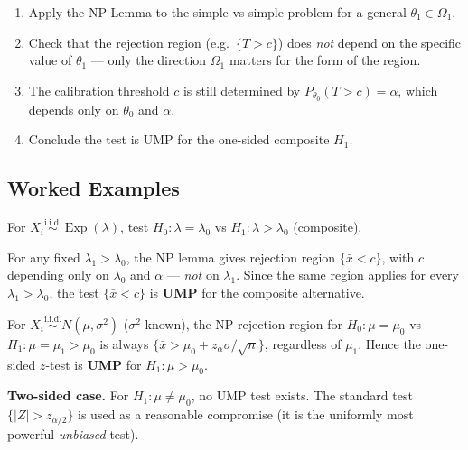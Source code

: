 \documentclass[11pt, a4paper]{article}
\newcommand{\iid}{\overset{\text{i.i.d.}}{\sim}}
\begin{document}
\begin{methodbox}
\begin{enumerate}
  \item Apply the NP Lemma to the simple-vs-simple problem for a general $\theta_1 \in \Omega_1$.
  \item Check that the rejection region (e.g.\ $\{T > c\}$) does \emph{not} depend on the specific value of $\theta_1$ --- only the direction $\Omega_1$ matters for the form of the region.
  \item The calibration threshold $c$ is still determined by $P_{\theta_0}(T > c) = \alpha$, which depends only on $\theta_0$ and $\alpha$.
  \item Conclude the test is UMP for the one-sided composite $H_1$.
\end{enumerate}
\end{methodbox}

\subsection*{Worked Examples}

\begin{exbox}
For $X_i \iid \operatorname{Exp}(\lambda)$, test $H_0\colon \lambda = \lambda_0$ vs $H_1\colon \lambda > \lambda_0$ (composite).

For any fixed $\lambda_1 > \lambda_0$, the NP lemma gives rejection region $\{\bar{x} < c\}$, with $c$ depending only on $\lambda_0$ and $\alpha$ --- \emph{not} on $\lambda_1$. Since the same region applies for every $\lambda_1 > \lambda_0$, the test $\{\bar{x} < c\}$ is \textbf{UMP} for the composite alternative.
\end{exbox}

\begin{exbox}
For $X_i \iid N(\mu, \sigma^2)$ ($\sigma^2$ known), the NP rejection region for $H_0\colon \mu = \mu_0$ vs $H_1\colon \mu = \mu_1 > \mu_0$ is always $\{\bar{x} > \mu_0 + z_\alpha\sigma/\sqrt{n}\}$, regardless of $\mu_1$. Hence the one-sided $z$-test is \textbf{UMP} for $H_1\colon \mu > \mu_0$.

\textbf{Two-sided case.} For $H_1\colon \mu \neq \mu_0$, no UMP test exists. The standard test $\{|Z| > z_{\alpha/2}\}$ is used as a reasonable compromise (it is the uniformly most powerful \emph{unbiased} test).
\end{exbox}
\end{document}
